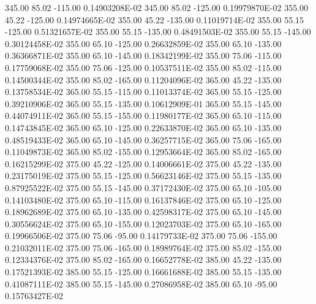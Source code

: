      345.00      85.02    -115.00      0.14903208E-02
     345.00      85.02    -125.00      0.19979870E-02
     355.00      45.22    -125.00      0.14974665E-02
     355.00      45.22    -135.00      0.11019714E-02
     355.00      55.15    -125.00      0.51321657E-02
     355.00      55.15    -135.00      0.48491503E-02
     355.00      55.15    -145.00      0.30124458E-02
     355.00      65.10    -125.00      0.26632859E-02
     355.00      65.10    -135.00      0.36366871E-02
     355.00      65.10    -145.00      0.18342199E-02
     355.00      75.06    -115.00      0.17759068E-02
     355.00      75.06    -125.00      0.10537511E-02
     355.00      85.02    -115.00      0.14500344E-02
     355.00      85.02    -165.00      0.11204096E-02
     365.00      45.22    -135.00      0.13758534E-02
     365.00      55.15    -115.00      0.11013374E-02
     365.00      55.15    -125.00      0.39210906E-02
     365.00      55.15    -135.00      0.10612909E-01
     365.00      55.15    -145.00      0.44074911E-02
     365.00      55.15    -155.00      0.11980177E-02
     365.00      65.10    -115.00      0.14743845E-02
     365.00      65.10    -125.00      0.22633870E-02
     365.00      65.10    -135.00      0.48519433E-02
     365.00      65.10    -145.00      0.36257715E-02
     365.00      75.06    -165.00      0.11049873E-02
     365.00      85.02    -155.00      0.12953664E-02
     365.00      85.02    -165.00      0.16215299E-02
     375.00      45.22    -125.00      0.14006661E-02
     375.00      45.22    -135.00      0.23175019E-02
     375.00      55.15    -125.00      0.56623146E-02
     375.00      55.15    -135.00      0.87925522E-02
     375.00      55.15    -145.00      0.37172430E-02
     375.00      65.10    -105.00      0.14103480E-02
     375.00      65.10    -115.00      0.16137846E-02
     375.00      65.10    -125.00      0.18962689E-02
     375.00      65.10    -135.00      0.42598317E-02
     375.00      65.10    -145.00      0.30556624E-02
     375.00      65.10    -155.00      0.12023703E-02
     375.00      65.10    -165.00      0.19966506E-02
     375.00      75.06     -95.00      0.14179733E-02
     375.00      75.06    -155.00      0.21032011E-02
     375.00      75.06    -165.00      0.18989764E-02
     375.00      85.02    -155.00      0.12334376E-02
     375.00      85.02    -165.00      0.16652778E-02
     385.00      45.22    -135.00      0.17521393E-02
     385.00      55.15    -125.00      0.16661688E-02
     385.00      55.15    -135.00      0.41087111E-02
     385.00      55.15    -145.00      0.27086958E-02
     385.00      65.10     -95.00      0.15763427E-02
